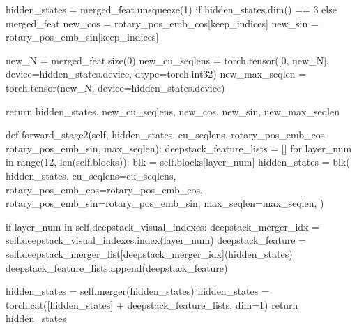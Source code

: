 \begin{CodeBlock}
    hidden_states = merged_feat.unsqueeze(1) if hidden_states.dim() == 3 else merged_feat
    new_cos = rotary_pos_emb_cos[keep_indices]
    new_sin = rotary_pos_emb_sin[keep_indices]

    new_N = merged_feat.size(0)
    new_cu_seqlens = torch.tensor([0, new_N], device=hidden_states.device, dtype=torch.int32)
    new_max_seqlen = torch.tensor(new_N, device=hidden_states.device)

    return hidden_states, new_cu_seqlens, new_cos, new_sin, new_max_seqlen


def forward_stage2(self, hidden_states, cu_seqlens, rotary_pos_emb_cos, rotary_pos_emb_sin, max_seqlen):
    deepstack_feature_lists = []
    for layer_num in range(12, len(self.blocks)):
        blk = self.blocks[layer_num]
        hidden_states = blk(
            hidden_states,
            cu_seqlens=cu_seqlens,
            rotary_pos_emb_cos=rotary_pos_emb_cos,
            rotary_pos_emb_sin=rotary_pos_emb_sin,
            max_seqlen=max_seqlen,
        )

        if layer_num in self.deepstack_visual_indexes:
            deepstack_merger_idx = self.deepstack_visual_indexes.index(layer_num)
            deepstack_feature = self.deepstack_merger_list[deepstack_merger_idx](hidden_states)
            deepstack_feature_lists.append(deepstack_feature)

    hidden_states = self.merger(hidden_states)
    hidden_states = torch.cat([hidden_states] + deepstack_feature_lists, dim=1)
    return hidden_states
\end{CodeBlock}

